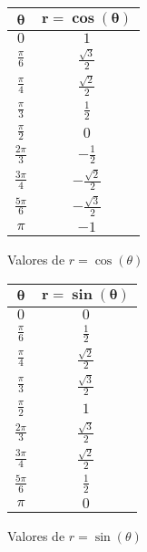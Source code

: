 \documentclass[12pt]{exam}
\begin{document}
\begin{questions}
  \begin{figure}[H]
    \centering
    \begin{minipage}{0.4\textwidth}
      \centering
      \begin{tabular}{c c}
        \hline
        $\boldsymbol{\theta}$ & $\boldsymbol{r = \cos(\theta)}$ \\
        \hline
        $0$ & $1$ \\
        $\frac{\pi}{6}$ & $\frac{\sqrt{3}}{2}$ \\
        $\frac{\pi}{4}$ & $\frac{\sqrt{2}}{2}$ \\
        $\frac{\pi}{3}$ & $\frac{1}{2}$ \\
        $\frac{\pi}{2}$ & $0$ \\
        $\frac{2\pi}{3}$ & $-\frac{1}{2}$ \\
        $\frac{3\pi}{4}$ & $-\frac{\sqrt{2}}{2}$ \\
        $\frac{5\pi}{6}$ & $-\frac{\sqrt{3}}{2}$ \\
        $\pi$ & $-1$ \\
        \hline
      \end{tabular}
      \caption{Valores de $r = \cos(\theta)$}
      \label{tab:cos_theta}
    \end{minipage}%
    \hspace{0.05\textwidth}
    \begin{minipage}{0.4\textwidth}
      \centering
      \begin{tabular}{c c}
        \hline
        $\boldsymbol{\theta}$ & $\boldsymbol{r = \sin(\theta)}$ \\
        \hline
        $0$ & $0$ \\
        $\frac{\pi}{6}$ & $\frac{1}{2}$ \\
        $\frac{\pi}{4}$ & $\frac{\sqrt{2}}{2}$ \\
        $\frac{\pi}{3}$ & $\frac{\sqrt{3}}{2}$ \\
        $\frac{\pi}{2}$ & $1$ \\
        $\frac{2\pi}{3}$ & $\frac{\sqrt{3}}{2}$ \\
        $\frac{3\pi}{4}$ & $\frac{\sqrt{2}}{2}$ \\
        $\frac{5\pi}{6}$ & $\frac{1}{2}$ \\
        $\pi$ & $0$ \\
        \hline
      \end{tabular}
      \caption{Valores de $r = \sin(\theta)$}
      \label{tab:sin_theta}
    \end{minipage}
  \end{figure}


\end{questions}
\end{document}
